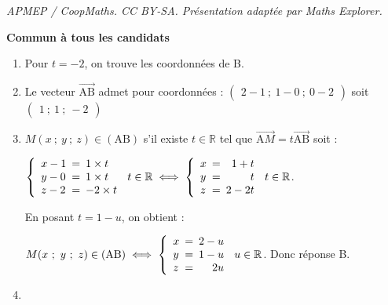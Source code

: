 \documentclass[10pt]{article}
\providecommand{\R}{\mathbb{R}}
\providecommand{\vect}[1]{\overrightarrow{#1}}
\begin{document}
\noindent\textit{APMEP / CoopMaths. CC BY-SA. Présentation adaptée par Maths Explorer.}\par\medskip
\textbf{Commun à tous les candidats}


















\begin{enumerate}
\item 








Pour $t = - 2$, on trouve les coordonnées de B.
\item 
Le vecteur $\vect{\text{AB}}$ admet pour coordonnées : $\begin{pmatrix}2 - 1~;~1 - 0~;~0 - 2\end{pmatrix}$ soit $\begin{pmatrix}1~;~1~;~- 2\end{pmatrix}$








\item 









$M(x~;~y~;~z) \in (\text{AB})$ s'il existe $t \in \R$ tel que $\vect{\text{A}M} = t\vect{\text{AB}}$ soit :

$\left\{\begin{array}{l !{=} l}
x - 1& 1\times t\\
y - 0& 1\times t\\
z - 2& - 2\times t
\end{array}\right.\, t \in \R \iff 
\left\{\begin{array}{l !{=} r}
x & 1 +  t\\
y &t\\
z & 2 - 2t
\end{array}\right.\, t \in \R 
$.

En posant $t = 1 - u$, on obtient :

$M(x~;~y~;~z) \in (\text{AB}) \iff \left\{\begin{array}{l !{=} r}
x & 2 - u\\
y &1 - u\\
z & 2u
\end{array}\right.\, u \in \R$. Donc réponse B.
\item 








\end{enumerate}
\end{document}
